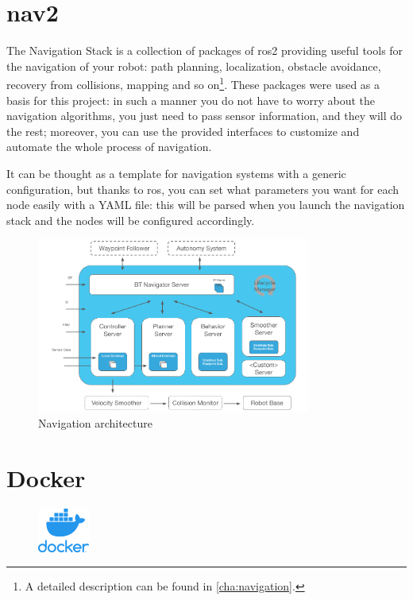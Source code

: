 \section{\acrfull{nav2}}

The Navigation Stack is a collection of packages of \acrshort{ros}2 providing useful tools for the navigation of your robot: path planning, localization, obstacle avoidance, recovery from collisions, mapping and so on\footnote{A detailed description can be found in \autoref{cha:navigation}.}. These packages were used as a basis for this project: in such a manner you do not have to worry about the navigation algorithms, you just need to pass sensor information, and they will do the rest; moreover, you can use the provided interfaces to customize and automate the whole process of navigation.

It can be thought as a template for navigation systems with a generic configuration, but thanks to \Acrshort{ros}, you can set what parameters you want for each node easily with a YAML file: this will be parsed when you launch the navigation stack and the nodes will be configured accordingly.

\begin{figure}[h]
    \centering
    \includegraphics[width=0.8\textwidth]{images/nav2_architecture}
    \caption{Navigation architecture}
\end{figure}

\section{Docker}
  
\begin{figure}
    \includegraphics[width=0.15\textwidth]{images/docker}
\end{figure}
  
